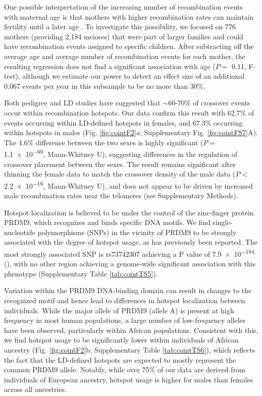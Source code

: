 One possible interpretation of the increasing number of
recombination events with maternal age is that mothers with
higher recombination rates can maintain fertility until a later
age\cite{Kong2004} . To investigate this possibility, we focused on 776 mothers
(providing 2,184 meioses) that were part of larger families and
could have recombination events assigned to specific children.
After subtracting off the average age and average number of
recombination events for each mother, the resulting regression
does not find a significant association with age ($P=$ 0.11, F-test),
although we estimate our power to detect an effect size of an
additional 0.067 events per year in this subsample to be no more
than 30\%.

Both pedigree and LD studies have suggested that $\sim$60-70\% of
crossover events occur within recombination hotspots\cite{Coop2008,Myers2005}. Our
data confirm this result with 62.7\% of events occurring within
LD-defined hotspots in females, and 67.3\% occurring within
hotspots in males (Fig. \ref{fig:cointF2}a; Supplementary Fig. \ref{fig:cointFS7}A). The 4.6\%
difference between the two sexes is highly significant
($P=$ \num{1.1e-69}, Mann-Whitney U), suggesting differences in
the regulation of crossover placement between the sexes. The
result remains significant after thinning the female data to match
the crossover density of the male data ($P<$ \num{2.2e-16},
Mann-Whitney U), and does not appear to be driven by
increased male recombination rates near the telomeres (see
Supplementary Methods).

Hotspot localization is believed to be under the control of the
zinc-finger protein PRDM9, which recognizes and binds specific
DNA motifs\cite{Berg2010,Berg2011,Hinch2011,Parvanov2010}. We find single-nucleotide polymorphisms
(SNPs) in the vicinity of PRDM9 to be strongly associated with
the degree of hotspot usage, as has previously been reported\cite{Kong2014,Hinch2011}.
The most strongly associated SNP is rs73742307 achieving a
P value of \num{7.9e-184} (\citet{Reynolds2013}), with no other region achieving a
genome-wide significant association with this phenotype
(Supplementary Table \ref{tab:cointTS5}).

Variation within the PRDM9 DNA-binding domain can result
in changes to the recognized motif and hence lead to differences
in hotspot localization between individuals. While the major allele
of PRDM9 (allele A) is present at high frequency in most human
populations, a large number of low-frequency alleles have been
observed, particularly within African populations\cite{Berg2011,Parvanov2010}. Consistent
with this, we find hotspot usage to be significantly lower within
individuals of African ancestry (Fig. \ref{fig:cointF2}b; Supplementary Table \ref{tab:cointTS6}),
which reflects the fact that the LD-defined hotspots are expected
to mostly represent the common PRDM9 allele. Notably, while
over 75\% of our data are derived from individuals of European
ancestry, hotspot usage is higher for males than females across all
ancestries.

